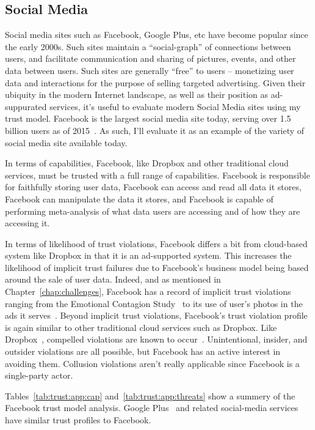 \subsection{Social Media}

Social media sites such as Facebook, Google Plus, etc have become
popular since the early 2000s. Such sites maintain a ``social-graph''
of connections between users, and facilitate communication and sharing
of pictures, events, and other data between users. Such sites are
generally ``free'' to users -- monetizing user data and interactions
for the purpose of selling targeted advertising. Given their ubiquity
in the modern Internet landscape, as well as their position as
ad-suppurated services, it's useful to evaluate modern Social Media
sites using my trust model. Facebook is the largest social media site
today, serving over 1.5 billion users as of 2015~\cite{foster2014}. As
such, I'll evaluate it as an example of the variety of social media
site available today.

In terms of capabilities, Facebook, like Dropbox and other traditional
cloud services, must be trusted with a full range of
capabilities. Facebook is responsible for faithfully storing user
data, Facebook can access and read all data it stores, Facebook can
manipulate the data it stores, and Facebook is capable of performing
meta-analysis of what data users are accessing and of how they are
accessing it.

In terms of likelihood of trust violations, Facebook differs a bit
from cloud-based system like Dropbox in that it is an ad-supported
system. This increases the likelihood of implicit trust failures due
to Facebook's business model being based around the sale of user
data. Indeed, and as mentioned in Chapter~\ref{chap:challenges},
Facebook has a record of implicit trust violations ranging from the
Emotional Contagion Study~\cite{goel2014} to its use of user's photos
in the ads it serves~\cite{mashable-socialads}. Beyond implicit trust
violations, Facebook's trust violation profile is again similar to
other traditional cloud services such as Dropbox. Like
Dropbox~\cite{dropbox-transparency}, compelled violations are known to
occur~\cite{facebook-transparency}. Unintentional, insider, and
outsider violations are all possible, but Facebook has an active
interest in avoiding them. Collusion violations aren't really
applicable since Facebook is a single-party actor.

Tables~\ref{tab:trust:app:cap} and~\ref{tab:trust:app:threats} show a
summery of the Facebook trust model analysis. Google
Plus~\cite{google-plus} and related social-media services have similar
trust profiles to Facebook.

